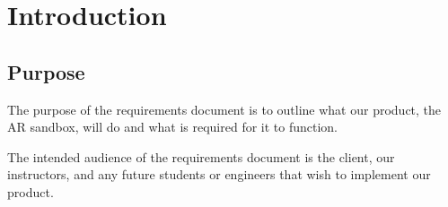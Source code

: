 \documentclass[onecolumn, draftclsnofoot,10pt, compsoc]{IEEEtran}
\begin{document}






\section{Introduction}
\subsection{Purpose}
The purpose of the requirements document is to outline what our product, the AR sandbox, will do and what is required for it to function.
\par The intended audience of the requirements document is the client, our instructors, and any future students or engineers that wish to implement our product.
\end{document}
